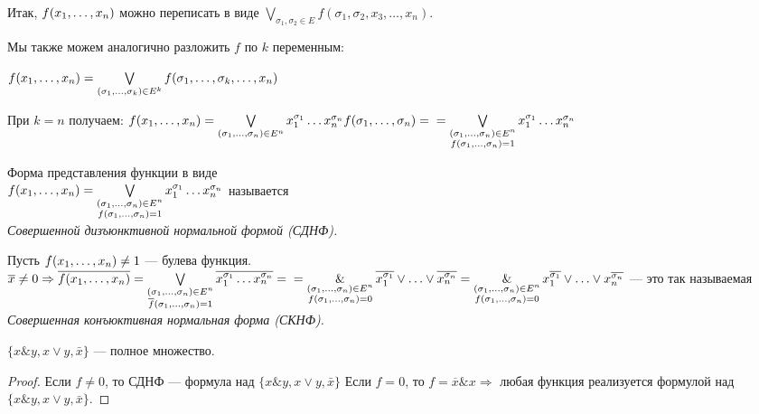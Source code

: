 Итак, $f(x_1, \ldots, x_n)$ можно переписать в виде $\bigvee \limits_{\sigma_1, \sigma_2 \in E} f(\sigma_1, \sigma_2, x_3, \ldots, x_n)$.

Мы также можем аналогично разложить $f$ по $k$ переменным:

$f(x_1, \ldots, x_n) = \bigvee \limits_{(\sigma_1,\ldots, \sigma_k) \in E^k} f(\sigma_1, \ldots, \sigma_k, \ldots, x_n)$

При $k = n$ получаем:  $f(x_1, \ldots, x_n) = \bigvee \limits_{(\sigma_1,\ldots, \sigma_n) \in E^n} x_1^{\sigma_1}\ldots x_n^{\sigma_n}f(\sigma_1, \ldots, \sigma_n) =\\ = \bigvee \limits_{\substack{(\sigma_1,\ldots, \sigma_n) \in E^n \\ f(\sigma_1, \ldots, \sigma_n) = 1}} x_1^{\sigma_1}\ldots x_n^{\sigma_n} $

\begin{df} Форма представления функции в виде\\ $f(x_1, \ldots, x_n)= \bigvee \limits_{\substack{(\sigma_1,\ldots, \sigma_n) \in E^n \\ f(\sigma_1, \ldots, \sigma_n) = 1}} x_1^{\sigma_1}\ldots x_n^{\sigma_n} $ называется\\ \textit{ Совершенной дизъюнктивной нормальной формой (СДНФ).}
\end{df}
\begin{df}
Пусть $f(x_1, \ldots, x_n) \ne 1$ --- булева функция.\\
$\overline{x} \ne 0 \Rightarrow \overline{f(x_1, \ldots, x_n)} = \bigvee \limits_{\substack{(\sigma_1,\ldots, \sigma_n) \in E^n \\ \overline{f}(\sigma_1, \ldots, \sigma_n) = 1}} \overline{x_1^{\sigma_1}\ldots x_n^{\sigma_n}} =\\ = \operatorname*{\&}\limits_{\substack{(\sigma_1,\ldots, \sigma_n) \in E^n \\ f(\sigma_1, \ldots, \sigma_n) = 0}} \overline{x_1^{\sigma_1}} \vee \ldots \vee  \overline{x_n^{\sigma_n}} = \operatorname*{\&}\limits_{\substack{(\sigma_1,\ldots, \sigma_n) \in E^n \\ f(\sigma_1, \ldots, \sigma_n) = 0}} x_1^{\overline{\sigma_1}} \vee \ldots \vee  x_n^{\overline{\sigma_n}}$ --- это так называемая \\ \textit{ Совершенная конъюктивная нормальная форма (СКНФ).}
\end{df}




\begin{statement}
$	\{x\&y, x \vee y, \bar{x} \}$ --- полное множество.
\end{statement}
\begin{proof}
    Если $f \ne 0$, то СДНФ --- формула над $\{x\&y, x \vee y, \bar{x} \}$
    Если $f = 0$, то $f = \overline{x} \& x \Rightarrow $ любая функция реализуется формулой над $\{x\&y, x \vee y, \bar{x} \}$.
\end{proof}

